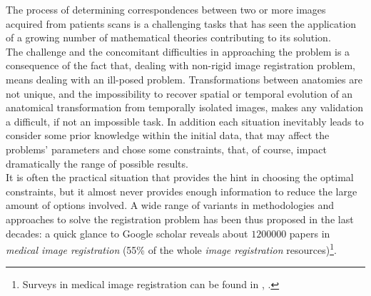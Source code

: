 The process of determining correspondences between two or more images acquired from patients scans is a challenging tasks that has seen the application of a growing number of mathematical theories contributing to its solution.\\
The challenge and the concomitant difficulties in approaching the problem is a consequence of the fact that, dealing with non-rigid image registration problem, means dealing with an ill-posed problem. Transformations between anatomies are not unique, and the impossibility to recover spatial or temporal evolution of an anatomical transformation from temporally isolated images, makes any validation a difficult, if not an impossible task. 
In addition each situation inevitably leads to consider some prior knowledge within the initial data, that may affect the problems' parameters and chose some constraints, that, of course, impact dramatically the range of possible results. \\
It is often the practical situation that provides the hint in choosing the optimal constraints, but it almost never provides enough information to reduce the large amount of options involved. A wide range of variants in methodologies and approaches to solve the registration problem has been thus proposed in the last decades: a quick glance to Google scholar reveals about $1200000$ papers in \emph{medical image registration} (55\% of the whole \emph{image registration} resources)\footnote{Surveys in medical image registration can be found in \cite{Sotiras:survey:13}, \cite{zitova2003image}.}.

